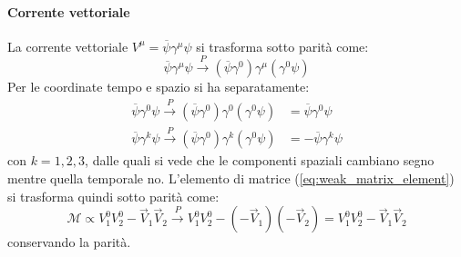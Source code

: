 \documentclass{subnucbo}
\begin{document}
\paragraph{Corrente vettoriale} La corrente vettoriale $V ^ { \mu } = \overline { \psi } \gamma ^ { \mu } \psi$ si trasforma sotto parità come:
\begin{equation}
        \overline { \psi } \gamma ^ { \mu } \psi \stackrel { P } { \rightarrow } \left( \overline { \psi } \gamma ^ { 0 } \right) \gamma ^ { \mu } \left( \gamma ^ { 0 } \psi \right)
\end{equation}
Per le coordinate tempo e spazio si ha separatamente:
\begin{equation}
        \begin{aligned}
                \overline { \psi } \gamma ^ { 0 } \psi \stackrel { P } { \rightarrow } \left( \overline { \psi } \gamma ^ { 0 } \right) \gamma ^ { 0 } \left( \gamma ^ { 0 } \psi \right) & = \overline { \psi } \gamma ^ { 0 } \psi \\ \overline { \psi } \gamma ^ { k } \psi \stackrel { P } { \rightarrow } \left( \overline { \psi } \gamma ^ { 0 } \right) \gamma ^ { k } \left( \gamma ^ { 0 } \psi \right) & = - \overline { \psi } \gamma ^ { k } \psi
        \end{aligned}
\end{equation}
con $k=1,2,3$, dalle quali si vede che le componenti spaziali cambiano segno mentre quella temporale no. L'elemento di matrice (\ref{eq:weak_matrix_element}) si trasforma quindi sotto parità come:
\begin{equation}
        \mathcal{M} \propto V _ { 1 } ^ { 0 } V _ { 2 } ^ { 0 } - \vec { V } _ { 1 } \vec { V } _ { 2 } \stackrel { P } { \rightarrow } V _ { 1 } ^ { 0 } V _ { 2 } ^ { 0 } - \left( - \vec { V } _ { 1 } \right) \left( - \vec { V } _ { 2 } \right) = V _ { 1 } ^ { 0 } V _ { 2 } ^ { 0 } - \vec { V } _ { 1 } \vec { V } _ { 2 }
\end{equation}
conservando la parità.
\end{document}
